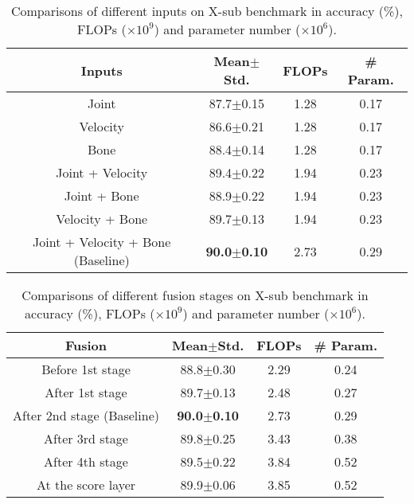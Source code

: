 \documentclass[10pt,journal,compsoc]{IEEEtran}
\begin{document}
\begin{table}[t]
  \caption{Comparisons of different inputs on X-sub benchmark in accuracy (\%), FLOPs ($\times10^9$) and parameter number ($\times10^6$).}
  \label{tab:input}
  \vspace{-0.4cm}
  \centering
  \setlength{\tabcolsep}{4pt}
  \renewcommand{\arraystretch}{1.2}
  \begin{tabular}{c|ccc}
  \toprule
  Inputs & Mean$\pm$Std. & FLOPs & \# Param. \\
  \midrule
  Joint & 87.7$\pm$0.15 & 1.28 & 0.17 \\
  Velocity & 86.6$\pm$0.21 & 1.28 & 0.17 \\
  Bone & 88.4$\pm$0.14 & 1.28 & 0.17 \\
  \midrule
  Joint + Velocity & 89.4$\pm$0.22 & 1.94 & 0.23 \\
  Joint + Bone & 88.9$\pm$0.22 & 1.94 & 0.23 \\
  Velocity + Bone & 89.7$\pm$0.13 & 1.94 & 0.23 \\
  \midrule
  Joint + Velocity + Bone (Baseline) & {\bf 90.0$\pm$0.10} & 2.73 & 0.29 \\
  \bottomrule
  \end{tabular}
\end{table}

\begin{table}[t]
  \caption{Comparisons of different fusion stages on X-sub benchmark in accuracy (\%), FLOPs ($\times10^9$) and parameter number ($\times10^6$).}
  \label{tab:fusion}
  \vspace{-0.4cm}
  \centering
  \setlength{\tabcolsep}{4pt}
  \renewcommand{\arraystretch}{1.2}
  \begin{tabular}{c|ccc}
  \toprule
  Fusion & Mean$\pm$Std. & FLOPs & \# Param. \\
  \midrule
  Before 1st stage & 88.8$\pm$0.30 & 2.29 & 0.24 \\
  After 1st stage & 89.7$\pm$0.13 & 2.48 & 0.27 \\
  After 2nd stage (Baseline) & {\bf 90.0$\pm$0.10} & 2.73 & 0.29 \\
  After 3rd stage & 89.8$\pm$0.25 & 3.43 & 0.38 \\
  After 4th stage & 89.5$\pm$0.22 & 3.84 & 0.52 \\
  At the score layer & 89.9$\pm$0.06 & 3.85 & 0.52 \\
  \bottomrule
  \end{tabular}
  \vspace{-0.4cm}
\end{table}
\end{document}
